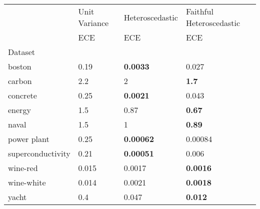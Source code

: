 \begin{tabular}{l|l|l|l}
\toprule
 & Unit Variance & Heteroscedastic & Faithful Heteroscedastic \\
 & ECE & ECE & ECE \\
Dataset &  &  &  \\
\midrule
boston & 0.19 & \bfseries 0.0033 & 0.027 \\
carbon & 2.2 & 2 & \bfseries 1.7 \\
concrete & 0.25 & \bfseries 0.0021 & 0.043 \\
energy & 1.5 & 0.87 & \bfseries 0.67 \\
naval & 1.5 & 1 & \bfseries 0.89 \\
power plant & 0.25 & \bfseries 0.00062 & 0.00084 \\
superconductivity & 0.21 & \bfseries 0.00051 & 0.006 \\
wine-red & 0.015 & 0.0017 & \bfseries 0.0016 \\
wine-white & 0.014 & 0.0021 & \bfseries 0.0018 \\
yacht & 0.4 & 0.047 & \bfseries 0.012 \\
\bottomrule
\end{tabular}
